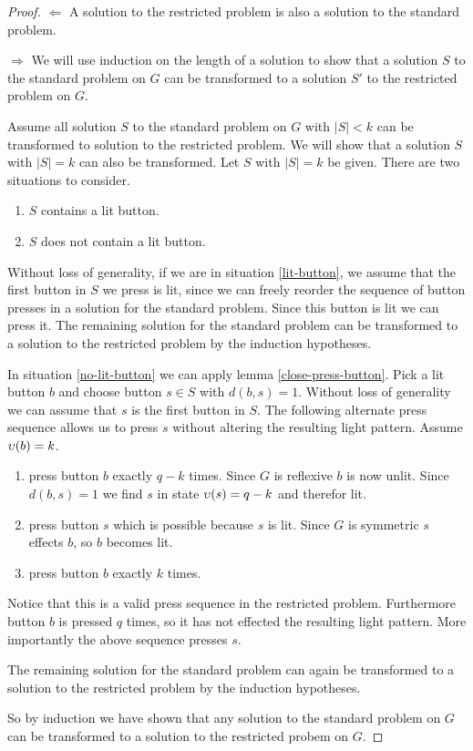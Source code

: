 \begin{proof}
    $\Longleftarrow$ A solution to the restricted problem is also a solution to the standard problem.

    $\Longrightarrow$ We will use induction on the length of a solution to show that a solution $S$ to the standard problem on $G$ can be transformed to a solution $S'$ to the restricted problem on $G$.

    Assume all solution $S$ to the standard problem on $G$ with $|S| < k$ can be transformed to solution to the restricted problem. We will show that a solution $S$ with $|S| = k$ can also be transformed.
    Let $S$ with $|S| = k$ be given. There are two situations to consider.

    \begin{enumerate}
        \item\label{lit-button} $S$ contains a lit button.
        \item\label{no-lit-button} $S$ does not contain a lit button.
    \end{enumerate}

    Without loss of generality, if we are in situation \ref{lit-button}, we assume that the first button in $S$ we press is lit, since we can freely reorder the sequence of button presses in a solution for the standard problem.
    Since this button is lit we can press it. The remaining solution for the standard problem can be transformed to a solution to the restricted problem by the induction hypotheses.

    In situation \ref{no-lit-button} we can apply lemma \ref{close-press-button}. Pick a lit button $b$ and choose button $s\in S$ with $d(b, s) = 1$. Without loss of generality we can assume that $s$ is the first button in $S$.
    The following alternate press sequence allows us to press $s$ without altering the resulting light pattern. Assume $\upsilon(b) = k$.

    \begin{enumerate}
        \item press button $b$ exactly $q-k$ times. Since $G$ is reflexive $b$ is now unlit. Since $d(b,s) = 1$ we find $s$ in state $\upsilon(s) = q-k$ and therefor lit.
        \item press button $s$ which is possible because $s$ is lit. Since $G$ is symmetric $s$ effects $b$, so $b$ becomes lit.
        \item press button $b$ exactly $k$ times.
    \end{enumerate}

    Notice that this is a valid press sequence in the restricted problem. Furthermore button $b$ is pressed $q$ times, so it has not effected the resulting light pattern.
    More importantly the above sequence presses $s$.

    The remaining solution for the standard problem can again be transformed to a solution to the restricted problem by the induction hypotheses.

    So by induction we have shown that any solution to the standard problem on $G$ can be transformed to a solution to the restricted probem on $G$.
\end{proof}

